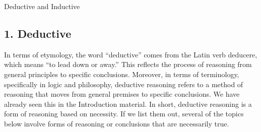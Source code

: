Deductive and Inductive

\subsection{1. Deductive}\label{deductive}

In terms of etymology, the word ``deductive'' comes from the Latin verb
deducere, which means ``to lead down or away.'' This reflects the
process of reasoning from general principles to specific conclusions.
Moreover, in terms of terminology, specifically in logic and philosophy,
deductive reasoning refers to a method of reasoning that moves from
general premises to specific conclusions. We have already seen this in
the Introduction material. In short, deductive reasoning is a form of
reasoning based on necessity. If we list them out, several of the topics
below involve forms of reasoning or conclusions that are necessarily
true.

